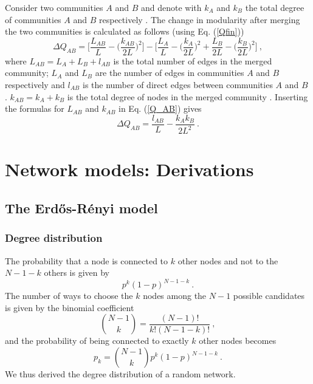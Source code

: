 \documentclass[11 pt , letterpaper , twoside , openright]{book}
\begin{document}
Consider two communities $A$ and $B$ and denote with $k_A$ and $k_B$ the total degree of communities $A$ and $B$ respectively \cite{Albert2016}. The change in modularity after merging the two communities is calculated as follows (using Eq. (\ref{Qfin})) \cite{Albert2016}
\begin{equation}\label{Q_AB}
	\Delta Q_{AB} = \bigg[\frac{L_{AB}}{L} - \bigg(\frac{k_{AB}}{2L} \bigg)^2 \bigg] - \bigg[\frac{L_A}{L} - \bigg(\frac{k_A}{2L} \bigg)^2 + \frac{L_B}{2L} - \bigg(\frac{k_B}{2L} \bigg)^2 \bigg] \ ,
\end{equation}
where $L_{AB} = L_A + L_B + l_{AB}$ is the total number of edges in the merged community; $L_A$ and $L_B$ are the number of edges in communities $A$ and $B$ respectively and $l_{AB}$ is the number of direct edges between communities $A$ and $B$ \cite{Albert2016}. $k_{AB} = k_A + k_B$ is the total degree of nodes in the merged community \cite{Albert2016}. Inserting the formulas for $L_{AB}$ and $k_{AB}$ in Eq. (\ref{Q_AB}) gives
\begin{equation}
	\Delta Q_{AB} = \frac{l_{AB}}{L} - \frac{k_Ak_B}{2L^2} \ .
\end{equation}

\chapter{Network models: Derivations}
\section{The Erd\H{o}s-R\'{e}nyi model}\label{ER}
\subsection{Degree distribution}\label{degdis}
The probability that a node is connected to $k$ other nodes and not to the $N-1-k$ others is given by
\begin{equation}
	p^k (1-p)^{N-1-k} \ .
\end{equation}
The number of ways to choose the $k$ nodes among the $N-1$ possible candidates is given by the binomial coefficient
\begin{equation}
	\binom{N-1}{k} = \frac{(N-1)!}{k!(N-1-k)!} \ ,
\end{equation}
and the probability of being connected to exactly $k$ other nodes becomes
\begin{equation}
	p_k = \binom{N-1}{k}p^k (1-p)^{N-1-k} \ .
\end{equation}
We thus derived the degree distribution of a random network.
\end{document}
